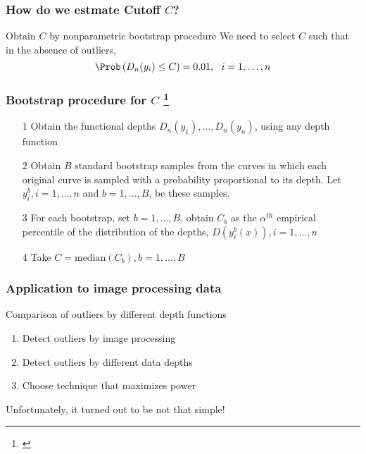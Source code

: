 \documentclass[10pt,dvipsnames,table]{beamer}
\begin{document}
\begin{frame}
\frametitle{How do we estmate Cutoff $C$?}
\Large
\begin{block}{Obtain $C$ by nonparametric bootstrap procedure}
We need to select $C$ such that in the absence of outliers, \[ \Prob\left( D_n(y_i) \leq C\right) = 0.01,\ \ i = 1, \dots, n \]
\end{block}

\end{frame}

\begin{frame}
\frametitle{Bootstrap procedure for $C$ \footnote{\cite{Febrero-Bande_etal_2007_Environmetrics}}}
\begin{enumerate}
\item[1] Obtain the functional depths $D_n(y_1), \dots, D_n(y_n)$, using any depth function
\pause
\item[2] Obtain $B$ standard bootstrap samples from the curves in which each original curve is sampled with a probability proportional to its depth. Let $y_i^b, i = 1, \dots, n$ and $b = 1, \dots, B$, be these samples.
\pause
\item[3] For each bootstrap, set $b = 1, \dots, B$, obtain $C_b$ as the $\alpha^{th}$ empirical percentile of the distribution of the depths, $D(y_i^b(x)), i = 1, \dots, n$
\pause
\item[4] Take $C = \text{median}(C_b), b = 1, \dots, B$ 
\end{enumerate}
\end{frame}

\begin{frame}
\frametitle{Application to image processing data}
\Large
\begin{block}{Comparison of outliers by different depth functions}
\begin{enumerate}
\item Detect outliers by image processing
\item Detect outliers by different data depths
\item Choose technique that maximizes power
\end{enumerate}
\end{block}

Unfortunately, it turned out to be not that simple!
\end{frame}
\end{document}
